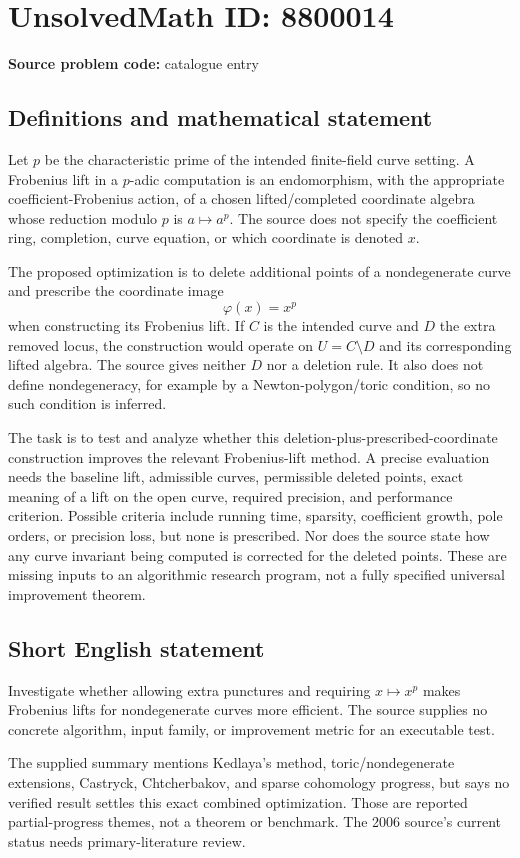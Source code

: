 \documentclass[11pt]{article}
\begin{document}
\section*{UnsolvedMath ID: 8800014}
\textbf{Source problem code:} catalogue entry
\subsection{Definitions and mathematical statement}
Let $p$ be the characteristic prime of the intended finite-field curve setting. A Frobenius lift in a $p$-adic computation is an endomorphism, with the appropriate coefficient-Frobenius action, of a chosen lifted/completed coordinate algebra whose reduction modulo $p$ is $a\mapsto a^p$. The source does not specify the coefficient ring, completion, curve equation, or which coordinate is denoted $x$.

The proposed optimization is to delete additional points of a nondegenerate curve and prescribe the coordinate image
\[
 \varphi(x)=x^p
\]
when constructing its Frobenius lift. If $C$ is the intended curve and $D$ the extra removed locus, the construction would operate on $U=C\setminus D$ and its corresponding lifted algebra. The source gives neither $D$ nor a deletion rule. It also does not define nondegeneracy, for example by a Newton-polygon/toric condition, so no such condition is inferred.

The task is to test and analyze whether this deletion-plus-prescribed-coordinate construction improves the relevant Frobenius-lift method. A precise evaluation needs the baseline lift, admissible curves, permissible deleted points, exact meaning of a lift on the open curve, required precision, and performance criterion. Possible criteria include running time, sparsity, coefficient growth, pole orders, or precision loss, but none is prescribed. Nor does the source state how any curve invariant being computed is corrected for the deleted points. These are missing inputs to an algorithmic research program, not a fully specified universal improvement theorem.
\subsection{Short English statement}
Investigate whether allowing extra punctures and requiring $x\mapsto x^p$ makes Frobenius lifts for nondegenerate curves more efficient. The source supplies no concrete algorithm, input family, or improvement metric for an executable test.

The supplied summary mentions Kedlaya's method, toric/nondegenerate extensions, Castryck, Chtcherbakov, and sparse cohomology progress, but says no verified result settles this exact combined optimization. Those are reported partial-progress themes, not a theorem or benchmark. The 2006 source's current status needs primary-literature review.
\end{document}
